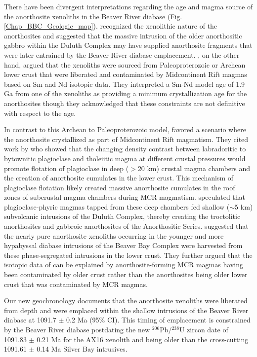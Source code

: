 There have been divergent interpretations regarding the age and magma source of the anorthosite xenoliths in the Beaver River diabase (Fig. \ref{Chap_BBC_Geologic_map}). \cite{Grout1939a} recognized the xenolithic nature of the anorthosites and suggested that the massive intrusion of the older anorthositic gabbro within the Duluth Complex may have supplied anorthosite fragments that were later entrained by the Beaver River diabase emplacement. \cite{Morrison1983a}, on the other hand, argued that the xenoliths were sourced from Paleoproterozoic or Archean lower crust that were liberated and contaminated by Midcontinent Rift magmas based on Sm and Nd isotopic data. They interpreted a Sm-Nd model age of 1.9 Ga from one of the xenoliths as providing a minimum crystallization age for the anorthosites though they acknowledged that these constraints are not definitive with respect to the age. 

In contrast to this Archean to Paleoproterozoic model, \cite{Miller1997a} favored a scenario where the anorthosite crystallized as part of Midcontinent Rift magmatism. They cited work by \cite{Kushiro1980a} who showed that the changing density contrast between labradoritic to bytownitic plagioclase and tholeiitic magma at different crustal pressures would promote flotation of plagioclase in deep ($>$20 km) crustal magma chambers and the creation of anorthosite cumulates in the lower crust. This mechanism of plagioclase flotation likely created massive anorthosite cumulates in the roof zones of subcrustal magma chambers during MCR magmatism. \cite{Miller1990a} speculated that plagioclase-phyric magmas tapped from these deep chambers fed shallow ($\sim$5 km) subvolcanic intrusions of the Duluth Complex, thereby creating the troctolitic anorthosites and gabbroic anorthosites of the Anorthositic Series. \cite{Miller1997a} suggested that the nearly pure anorthosite xenoliths occurring in the younger and more hypabyssal diabase intrusions of the Beaver Bay Complex were harvested from these phase-segregated intrusions in the lower crust. They further argued that the isotopic data of \cite{Morrison1983a} can be explained by anorthosite-forming MCR magmas having been contaminated by older crust rather than the anorthosites being older lower crust that was contaminated by MCR magmas.

Our new geochronology documents that the anorthosite xenoliths were liberated from depth and were emplaced within the shallow intrusions of the Beaver River diabase at 1091.7 $\pm$ 0.2 Ma (95\% CI). This timing of emplacement is constrained by the Beaver River diabase postdating the new $^{206}$Pb/$^{238}$U zircon date of 1091.83 $\pm$ 0.21 Ma for the AX16 xenolith and being older than the cross-cutting 1091.61 $\pm$ 0.14 Ma Silver Bay intrusives.

